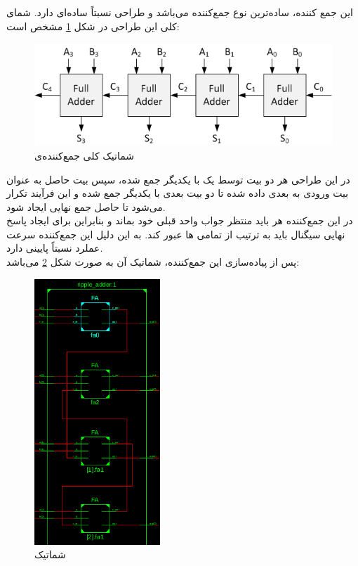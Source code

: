 \documentclass{article}
\begin{document}
\subsection{}
این جمع کننده، ساده‌ترین نوع جمع‌کننده می‌باشد و طراحی نسبتاً ساده‌ای دارد. شمای کلی این طراحی در شکل \ref{fig:rip-car-schem} مشخص است:
\begin{figure}[H]
\centering
\includegraphics[width=12cm]{ripple-carry-adder-schematic}
\caption{شماتیک کلی جمع‌کننده‌ی }
\label{fig:rip-car-schem}
\end{figure}
\noindent
در این طراحی هر دو بیت توسط یک  با یکدیگر جمع شده، سپس بیت  حاصل به عنوان بیت  ورودی به  بعدی داده شده تا دو بیت بعدی با یکدیگر جمع شده و این فرآیند تکرار می‌شود تا حاصل جمع نهایی ایجاد شود. \\
در این جمع‌کننده هر  باید منتظر جواب واحد قبلی خود بماند و بنابراین برای ایجاد پاسخ نهایی سیگنال باید به ترتیب از تمامی ها عبور کند. به این دلیل این جمع‌کننده سرعت عملرد نسبتاً پایینی دارد.\\
پس از پیاده‌سازی این جمع‌کننده، شماتیک  آن به صورت شکل \ref{fig:rip-car-rtl} می‌باشد:
\begin{figure}[H]
\centering
\includegraphics[height=10cm]{ripple-carry-adder-rtl}
\caption{شماتیک }
\label{fig:rip-car-rtl}
\end{figure}
\end{document}
